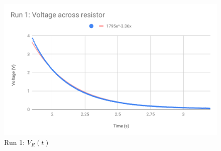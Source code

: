 \begin{figure}[ht]
    \centering
    \includegraphics[scale=0.74]{image/05-RC-RL/run-1-vR-no-tail.pdf}
    \caption{Run 1: $V_{R}(t)$}
    \label{figure.05.run.1.vR.no.tail}
\end{figure}
